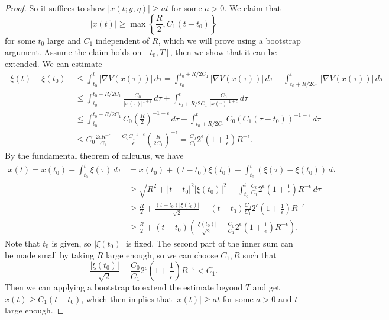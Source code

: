 \begin{proof}
  So it suffices to show $|x(t; y, \eta)| \ge at$
  for some $a > 0$.
  We claim that
  \[
    |x(t)| \ge \max\left\{\frac{R}{2}, C_1(t - t_0)\right\}
  \]
  for some $t_0$ large and $C_1$ independent
  of $R$, which we will prove using a
  bootstrap argument. Assume the claim holds
  on $[t_0, T]$, then we show that it can be
  extended. We can estimate
  \begin{align*}
    |\xi(t) - \xi(t_0)|
    &\le \int_{t_0}^t |\nabla V(x(\tau))|\, d\tau
    = \int_{t_0}^{t_0 + R / 2C_1} |\nabla V(x(\tau))|\, d\tau
    + \int_{t_0 + R / 2C_1}^t |\nabla V(x(\tau))|\, d\tau \\
    &\le \int_{t_0}^{t_0 + R / 2 C_1} \frac{C_0}{|x(\tau)|^{1 + \epsilon}}\, d\tau
    + \int_{t_0 + R / 2C_1}^t \frac{C_0}{|x(\tau)|^{1 + \epsilon}}\, d\tau \\
    &\le \int_{t_0}^{t_0 + R / 2 C_1} C_0 \left(\frac{R}{2}\right)^{-1 - \epsilon}\, d\tau
    + \int_{t_0 + R / 2C_1}^t C_0 (C_1(\tau - t_0))^{-1 - \epsilon}\, d\tau \\
    &\le C_0 \frac{2\epsilon R^{-\epsilon}}{C_1}
    + \frac{C_0 C_1^{-1 - \epsilon}}{\epsilon}
    \left(\frac{R}{2C_1}\right)^{-\epsilon}
    = \frac{C_0}{C_1} 2^\epsilon \left(1 + \frac{1}{\epsilon}\right) R^{-\epsilon}.
  \end{align*}
  By the fundamental theorem of calculus, we have
  \begin{align*}
    x(t) = x(t_0) + \int_{t_0}^t \xi(\tau)\, d\tau
    &= x(t_0) + (t - t_0) \xi(t_0) + \int_{t_0}^t (\xi(\tau) - \xi(t_0))\, d\tau \\
    &\ge \sqrt{R^2 + |t - t_0|^2 |\xi(t_0)|^2}
    - \int_{t_0}^t \frac{C_0}{C_1} 2^\epsilon \left(1 + \frac{1}{\epsilon}\right) R^{-\epsilon}\, d\tau \\
    &\ge \frac{R}{2} + \frac{(t - t_0) |\xi(t_0)|}{\sqrt{2}} - (t - t_0) \frac{C_0}{C_1} 2^\epsilon \left(1 + \frac{1}{\epsilon}\right) R^{-\epsilon} \\
    &\ge \frac{R}{2} + (t - t_0) \left(\frac{|\xi(t_0)|}{\sqrt{2}} - \frac{C_0}{C_1} 2^\epsilon \left(1 + \frac{1}{\epsilon}\right) R^{-\epsilon}\right).
  \end{align*}
  Note that $t_0$ is given, so $|\xi(t_0)|$ is
  fixed. The second part of the inner sum
  can be made small by taking $R$ large enough,
  so we can choose $C_1, R$ such that
  \[
    \frac{|\xi(t_0)|}{\sqrt{2}}
    - \frac{C_0}{C_1} 2^\epsilon \left(1 + \frac{1}{\epsilon}\right) R^{-\epsilon}
    < C_1.
  \]
  Then we can applying a bootstrap to
  extend the estimate beyond $T$ and get
  $x(t) \ge C_1(t - t_0)$, which then implies
  that $|x(t)| \ge at$ for some $a > 0$ and
  $t$ large enough.
\end{proof}

